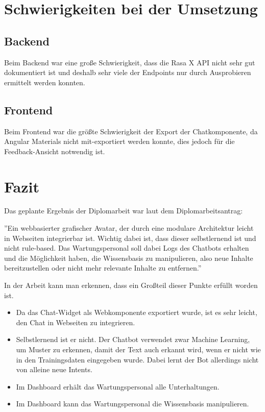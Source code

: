 \section{Schwierigkeiten bei der Umsetzung}

\subsection{Backend}
Beim Backend war eine große Schwierigkeit, dass die Rasa X API nicht sehr gut dokumentiert ist und deshalb sehr viele der Endpoints nur durch Ausprobieren ermittelt werden konnten.


\subsection{Frontend}
Beim Frontend war die größte Schwierigkeit der Export der Chatkomponente, da Angular Materials nicht mit-exportiert werden konnte, dies jedoch für die Feedback-Ansicht notwendig ist.

\section{Fazit}
Das geplante Ergebnis der Diplomarbeit war laut dem Diplomarbeitsantrag:

''Ein webbasierter grafischer Avatar, der durch eine modulare Architektur leicht in Webseiten integrierbar ist.
Wichtig dabei ist, dass dieser selbstlernend ist und nicht rule-based.
Das Wartungspersonal soll dabei Logs des Chatbots erhalten und die Möglichkeit haben, die Wissensbasis zu manipulieren, also neue Inhalte bereitzustellen oder nicht mehr relevante Inhalte zu entfernen.''

In der Arbeit kann man erkennen, dass ein Großteil dieser Punkte erfüllt worden ist.

\begin{itemize}
    \item Da das Chat-Widget als Webkomponente exportiert wurde, ist es sehr leicht, den Chat in Webseiten zu integrieren.
    \item Selbstlernend ist er nicht.
    Der Chatbot verwendet zwar Machine Learning, um Muster zu erkennen, damit der Text auch erkannt wird, wenn er nicht wie in den Trainingsdaten eingegeben wurde.
    Dabei lernt der Bot allerdings nicht von alleine neue Intents.
    \item Im Dashboard erhält das Wartungspersonal alle Unterhaltungen.
    \item Im Dashboard kann das Wartungspersonal die Wissensbasis manipulieren.
\end{itemize}

